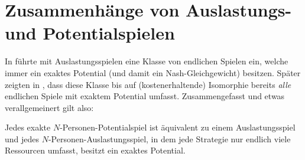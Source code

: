 \section{Zusammenhänge von Auslastungs- und Potentialspielen}\label{sec:Auslastungsspiele}

In \cite{RosenthalPotential} führte \citeauthor{RosenthalPotential} mit Auslastungsspielen eine Klasse von endlichen Spielen ein, welche immer ein exaktes Potential (und damit ein Nash-Gleichgewicht) besitzen. Später zeigten \citeauthor{MonShap} in \cite[Theorem 3.2]{MonShap}, dass diese Klasse bis auf (kostenerhaltende) Isomorphie bereits \emph{alle} endlichen Spiele mit exaktem Potential umfasst. Zusammengefasst und etwas verallgemeinert gilt also:

\begin{satz}\label{satz:MondererShapley}
	Jedes exakte $N$-Personen-Potentialspiel ist äquivalent zu einem Auslastungsspiel und jedes $N$-Personen-Auslastungsspiel, in dem jede Strategie nur endlich viele Ressourcen umfasst, besitzt ein exaktes Potential.
\end{satz}

